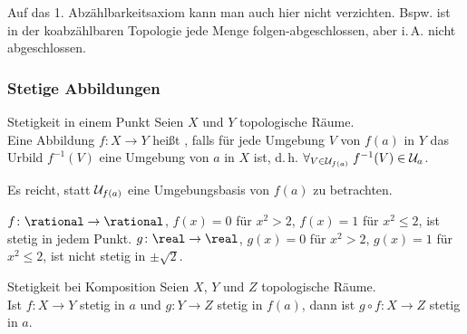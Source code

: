 \begin{Bem}
    Auf das 1. Abzählbarkeitsaxiom kann man auch hier nicht verzichten.
    Bspw. ist in der koabzählbaren Topologie jede Menge
    folgen-abgeschlossen, aber i.\,A. nicht abgeschlossen.
\end{Bem}

\subsubsection{%
    Stetige Abbildungen%
}

\begin{Def}{Stetigkeit in einem Punkt}
    Seien $X$ und $Y$ topologische Räume. \\
    Eine Abbildung $f\colon X \rightarrow Y$ heißt
    , falls für jede Umgebung $V$ von $f(a)$ in
    $Y$ das Urbild $f^{-1}(V)$ eine
    Umgebung von $a$ in $X$ ist, d.\,h.
    $\forall_{V \in \mathcal{U}_{f(a)}}\; f^{-1}(V) \in \mathcal{U}_a$.
\end{Def}

\begin{Bem}
    Es reicht, statt $\mathcal{U}_{f(a)}$ eine Umgebungsbasis von $f(a)$ zu betrachten.
\end{Bem}

\begin{Bsp}
    $f\colon \rational \rightarrow \rational$, $f(x) = 0$ für $x^2 > 2$,
    $f(x) = 1$ für $x^2 \le 2$, ist stetig in jedem Punkt.
    $g\colon \real \rightarrow \real$, $g(x) = 0$ für $x^2 > 2$,
    $g(x) = 1$ für $x^2 \le 2$, ist nicht stetig in $\pm \sqrt{2}$.
\end{Bsp}

\begin{Satz}{Stetigkeit bei Komposition}
    Seien $X$, $Y$ und $Z$ topologische Räume. \\
    Ist $f\colon X \rightarrow Y$ stetig in $a$ und
    $g\colon Y \rightarrow Z$ stetig in $f(a)$, dann ist
    $g \circ f\colon X \rightarrow Z$ stetig in $a$.
\end{Satz}

\linie

